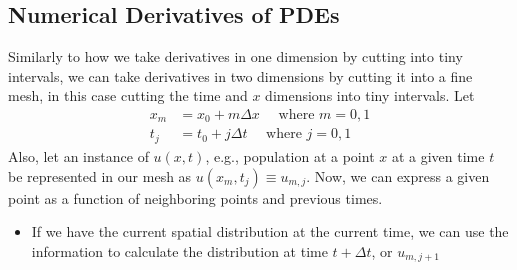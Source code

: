 \documentclass[10pt]{article}
\begin{document}
\subsection*{Numerical Derivatives of PDEs}
Similarly to how we take derivatives in one dimension by cutting into tiny intervals, we can take derivatives in two dimensions by cutting it into a fine mesh, in this case cutting the time and $x$ dimensions into tiny intervals.
Let
\begin{align*}
    x_m &= x_0 + m \Delta x \quad\text{ where } m = 0, 1\\
    t_j &= t_0 + j \Delta t \quad\text{ where } j = 0, 1
\end{align*}
Also, let an instance of $u(x, t)$, e.g., population at a point $x$ at a given time $t$ be represented in our mesh as $u(x_m, t_j) \equiv u_{m, j}$.  Now, we can express a given point as a function of neighboring points and previous times.
\begin{itemize}
    \item If we have the current spatial distribution at the current time, we can use the information to calculate the distribution at time $t + \Delta t$, or $u_{m, j + 1}$
\end{itemize}
\end{document}
